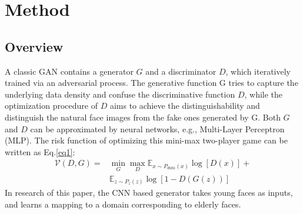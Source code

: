 \documentclass[10pt,twocolumn,letterpaper]{article}
\begin{document}
\section{Method}
\subsection{Overview}
A classic GAN contains a generator $G$ and a discriminator $D$, which iteratively trained via an adversarial process. The generative function G tries to capture the underlying data density and confuse the discriminative function $D$, while the optimization procedure of $D$ aims to achieve
the distinguishability and distinguish the natural face images from the fake ones generated by G. Both $G$ and $D$ can be approximated by neural networks, e.g., Multi-Layer Perceptron (MLP). The risk function of optimizing this mini-max two-player game can be written as Eq.\ref{eq1}:
\begin{equation}
  \begin{aligned}
   \mathcal{V}\left(D,G\right) = &\min_G \max_D \mathbb{E}_{x\sim P_{data}\left(x\right)} \log\left[D\left(x\right)\right] +\\
   & \mathbb{E}_{z\sim P_{z}\left(z\right)} \log\left[1-D\left(G\left(z\right)\right)\right]
  \end{aligned}
  \label{eq1}
\end{equation}
In research of this paper, the CNN based generator takes young
faces as inputs, and learns a mapping to a domain corresponding 
to elderly faces.
{\small
	
	
}
\end{document}
